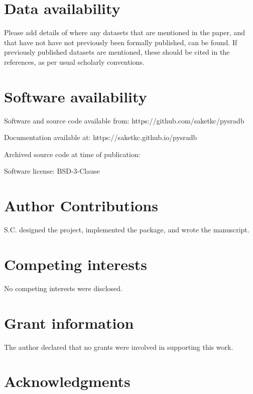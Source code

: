 \documentclass[9pt,a4paper]{extarticle}
\begin{document}
\section*{Data availability} %
Please add details of where any datasets that are mentioned in the paper, and that have not have not previously been formally published, can be found.  If previously published datasets are mentioned, these should be cited in the references, as per usual scholarly conventions.

\section*{Software availability}
Software and source code available from: https://github.com/saketkc/pysradb

Documentation available at: https://saketkc.github.io/pysradb

Archived source code at time of publication: 

Software license: BSD-3-Clause

\section*{Author Contributions}
S.C. designed the project, implemented the package, and wrote the manuscript.

\section*{Competing interests}
No competing interests were disclosed.

\section*{Grant information}
The author declared that no grants were involved in supporting this work.

\section*{Acknowledgments}

\begin{comment}
This section should acknowledge anyone who contributed to the research or the
article but who does not qualify as an author based on the criteria provided earlier
(e.g. someone or an organization that provided writing assistance). Please state how
they contributed; authors should obtain permission to acknowledge from all those
mentioned in the Acknowledgments section.

Please do not list grant funding in this section.
\end{comment}
\end{document}
